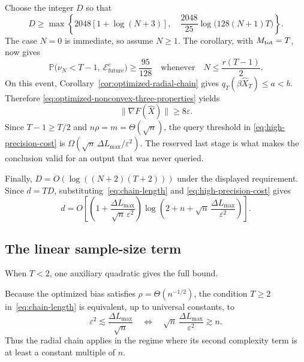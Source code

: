 \documentclass{article}
\theoremstyle{definition}
\newcommand{\Prob}{\mathbb{P}}
\newcommand{\cEfuture}{\mathcal{E}_{\mathrm{future}}}
\begin{document}
Choose the integer $D$ so that
\begin{equation}
 D\ge\max\left\{
 2048[1+\log(N+3)],\quad
 \frac{2048}{25}\log\bigl(128(N+1)T\bigr)
 \right\}.
 \label{eq:nonconvex-local-dimension-requirements}
\end{equation}
The case $N=0$ is immediate, so assume $N\ge1$.
The corollary, with $M_{\rm tot}=T$, now gives
\begin{equation}
 \Prob\bigl(\nu_N<T-1,\ \cEfuture^c\bigr)\ge\frac{95}{128}
 \quad\text{whenever}\quad
 N\le\frac{r(T-1)}2.
 \label{eq:high-precision-cost}
\end{equation}
On this event, Corollary~\ref{cor:optimized-radial-chain} gives
$q_T(\beta\widehat X_T)\le a<b$.  Therefore
\eqref{eq:optimized-nonconvex-three-properties} yields
\begin{equation}
 \|\nabla F(\widehat X)\|\ge8\varepsilon.
\end{equation}
Since $T-1\ge T/2$ and $n\rho=m=\Theta(\sqrt n)$, the query threshold in
\eqref{eq:high-precision-cost} is
$\Omega(\sqrt n\,\Delta L_{\max}/\varepsilon^2)$.  The reserved last stage is
what makes the conclusion valid for an output that was never queried.

Finally, $D=O(\log((N+2)(T+2)))$ under the displayed requirement.
Since $d=TD$, substituting~\eqref{eq:chain-length} and
\eqref{eq:high-precision-cost} gives
\begin{equation}
 d=O\!\left[
 \left(1+\frac{\Delta L_{\max}}{\sqrt n\,\varepsilon^2}\right)
 \log\!\left(2+n+\sqrt n\,\frac{\Delta L_{\max}}{\varepsilon^2}\right)
 \right].
 \label{eq:nonconvex-dimension}
\end{equation}

\subsection{The linear sample-size term}

When $T<2$, one auxiliary quadratic gives the full bound.

Because the optimized bias satisfies $\rho=\Theta(n^{-1/2})$, the condition
$T\ge2$ in~\eqref{eq:chain-length} is equivalent, up to universal constants, to
\begin{equation}
 \varepsilon^2\lesssim\frac{\Delta L_{\max}}{\sqrt n}
 \quad\Longleftrightarrow\quad
 \sqrt n\,\frac{\Delta L_{\max}}{\varepsilon^2}\gtrsim n.
 \label{eq:nonconvex-regime-split}
\end{equation}
Thus the radial chain applies in the regime where its second complexity term is
at least a constant multiple of $n$.
\end{document}
